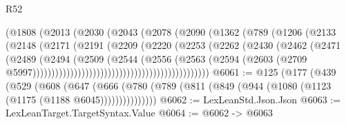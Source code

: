\begin{lexlean}{R52}
\begin{coremodule}
{{{{{{{{{{{{{{{{{{{{{{{{{{{{{{{{{{{{{{{{{{{{{{{{{{{{{{{{{{{{{{{{{{{{{{{{{{{{{{{{{{{{{{{{{{{{{{{{{{{{{{{{{{{{{{{{{{{{{{{{{{{{{{{{{{{{{{{{{{{{{{{{{{{{{{{{{{{{{{{{{{{{{{{{{{{{{{{{{{{{{{{{{{{{{{{{{{{{{{                                        (@1808
                                          (@2013
                                            (@2030
                                              (@2043
                                                (@2078
                                                  (@2090
                                                    (@1362
                                                      (@789
                                                        (@1206
                                                          (@2133
                                                            (@2148
                                                              (@2171
                                                                (@2191
                                                                  (@2209
                                                                    (@2220
                                                                      (@2253
                                                                        (@2262
                                                                          (@2430
                                                                            (@2462
                                                                              (@2471
                                                                                (@2489
                                                                                  (@2494
                                                                                    (@2509
                                                                                      (@2544
                                                                                        (@2556
                                                                                          (@2563
                                                                                            (@2594
                                                                                              (@2603
                                                                                                (@2709
                                                                                                  @5997)))))))))))))))))))))))))))))))))))))))))))))))
@6061 := @125
    (@177
      (@439
        (@529
          (@608
            (@647
              (@666 (@780 (@789 (@811 (@849 (@944 (@1080 (@1123 (@1175 (@1188 @6045)))))))))))))))
@6062 := LexLeanStd.Json.Json
@6063 := LexLeanTarget.TargetSyntax.Value
@6064 := @6062 -> @6063
}}}}}}}}}}}}}}}}}}}}}}}}}}}}}}}}}}}}}}}}}}}}}}}}}}}}}}}}}}}}}}}}}}}}}}}}}}}}}}}}}}}}}}}}}}}}}}}}}}}}}}}}}}}}}}}}}}}}}}}}}}}}}}}}}}}}}}}}}}}}}}}}}}}}}}}}}}}}}}}}}}}}}}}}}}}}}}}}}}}}}}}}}}}}}}}}}}}}}}
\end{coremodule}
\end{lexlean}
